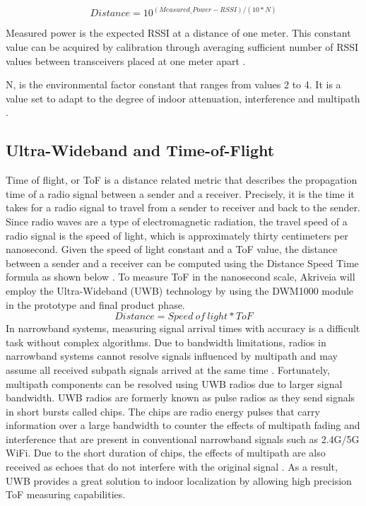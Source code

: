 \begin{equation*}
    Distance = 10^{(Measured\_Power - RSSI)/(10*N)}
\end{equation*}

\medskip
Measured power is the expected RSSI at a distance of one meter. This constant value can be acquired by calibration through averaging sufficient number of RSSI values between transceivers placed at one meter apart \cite{R2-5-3}.

\bigskip
N, is the environmental factor constant that ranges from values 2 to 4. It is a value set to adapt to the degree of indoor attenuation, interference and multipath \cite{R2-5-3}.

\medskip
\subsection{Ultra-Wideband and Time-of-Flight}
\medskip
Time of flight, or ToF is a distance related metric that describes the propagation time of a radio signal between a sender and a receiver. Precisely, it is the time it takes for a radio signal to travel from a sender to receiver and back to the sender. Since radio waves are a type of electromagnetic radiation, the travel speed of a radio signal is the speed of light, which is approximately thirty centimeters per nanosecond. Given the speed of light constant and a ToF value, the distance between a sender and a receiver can be computed using the Distance Speed Time formula as shown below \cite{R2-5-1}. To measure ToF in the nanosecond scale, Akriveia will employ the Ultra-Wideband (UWB) technology by using the DWM1000 module in the prototype and final product phase.
\begin{equation*}
    Distance = Speed\:of\:light * ToF
\end{equation*}
\medskip
In narrowband systems, measuring signal arrival times with accuracy is a difficult task without complex algorithms. Due to bandwidth limitations, radios in narrowband systems cannot resolve signals influenced by multipath and may assume all received subpath signals arrived at the same time \cite{R2-5-2}. Fortunately, multipath components can be resolved using UWB radios due to larger signal bandwidth. UWB radios are formerly known as pulse radios as they send signals in short bursts called chips. The chips are radio energy pulses that carry information over a large bandwidth to counter the effects of multipath fading and interference that are present in conventional narrowband signals such as 2.4G/5G WiFi. Due to the short duration of chips, the effects of multipath are also received as echoes that do not interfere with the original signal \cite{R2-5-1}. As a result, UWB provides a great solution to indoor localization by allowing high precision ToF measuring capabilities.



